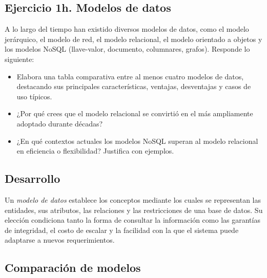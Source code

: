 
\begin{landscape}
\section*{Ejercicio 1h. Modelos de datos}

\begin{tcolorbox}[
  colback=lightgray,
  colframe=unamblue,
  title=Enunciado,
  fonttitle=\bfseries,
  boxrule=1pt,
  arc=2mm
]
A lo largo del tiempo han existido diversos modelos de datos, como el modelo
jerárquico, el modelo de red, el modelo relacional, el modelo orientado a
objetos y los modelos NoSQL (llave-valor, documento, columnares, grafos).
Responde lo siguiente:

\begin{itemize}
  \item Elabora una tabla comparativa entre al menos cuatro modelos de datos,
  destacando sus principales características, ventajas, desventajas y casos de
  uso típicos.
  \item ¿Por qué crees que el modelo relacional se convirtió en el más
  ampliamente adoptado durante décadas?
  \item ¿En qué contextos actuales los modelos NoSQL superan al modelo
  relacional en eficiencia o flexibilidad? Justifica con ejemplos.
\end{itemize}
\end{tcolorbox}

\subsection*{Desarrollo}

Un \textit{modelo de datos} establece los conceptos mediante los cuales se
representan las entidades, sus atributos, las relaciones y las restricciones
de una base de datos. Su elección condiciona tanto la forma de consultar la
información como las garantías de integridad, el costo de escalar y la facilidad
con la que el sistema puede adaptarse a nuevos requerimientos.

\subsection*{Comparación de modelos}


\end{landscape}
